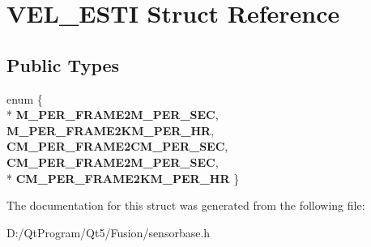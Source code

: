 \hypertarget{struct_v_e_l___e_s_t_i}{}\section{V\+E\+L\+\_\+\+E\+S\+T\+I Struct Reference}
\label{struct_v_e_l___e_s_t_i}
\subsection*{Public Types}
\begin{DoxyCompactItemize}
\item 
\hypertarget{struct_v_e_l___e_s_t_i_a46e0fedd788029c2a68abc7ec2010b17}{}enum \{ \\*
{\bfseries M\+\_\+\+P\+E\+R\+\_\+\+F\+R\+A\+M\+E2\+M\+\_\+\+P\+E\+R\+\_\+\+S\+E\+C}, 
{\bfseries M\+\_\+\+P\+E\+R\+\_\+\+F\+R\+A\+M\+E2\+K\+M\+\_\+\+P\+E\+R\+\_\+\+H\+R}, 
{\bfseries C\+M\+\_\+\+P\+E\+R\+\_\+\+F\+R\+A\+M\+E2\+C\+M\+\_\+\+P\+E\+R\+\_\+\+S\+E\+C}, 
{\bfseries C\+M\+\_\+\+P\+E\+R\+\_\+\+F\+R\+A\+M\+E2\+M\+\_\+\+P\+E\+R\+\_\+\+S\+E\+C}, 
\\*
{\bfseries C\+M\+\_\+\+P\+E\+R\+\_\+\+F\+R\+A\+M\+E2\+K\+M\+\_\+\+P\+E\+R\+\_\+\+H\+R}
 \}\label{struct_v_e_l___e_s_t_i_a46e0fedd788029c2a68abc7ec2010b17}

\end{DoxyCompactItemize}


The documentation for this struct was generated from the following file\+:\begin{DoxyCompactItemize}
\item 
D\+:/\+Qt\+Program/\+Qt5/\+Fusion/sensorbase.\+h\end{DoxyCompactItemize}
